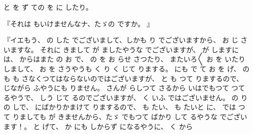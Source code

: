 と
を
ず
ての
を
に
したり。

『それは
もいけませんなナ、たゞの
ですか。
』

『イエもう、
の
した
でございまして、しかも
り
でございますから、
お
じ
さいますな。
それに
きまして
が
ましたやうな
でございますが、
が
しますには、
からはまた
の
お
で、
の
を
お
らせ
さつたり、
またいろ〳〵
お
を
いたりしまして、
お
を
さうやうも
く
り
く
じて
りまする。
にも
で
て
お
を
げ、
の
も
も
さなくつてはならないのではございますが、
と
も
つて
りまするので、
じながら
ふやうにも
りません。
さんが
らしつて
さるから
いはでもつて
つて
るやうで、
しう
じて
るのでございますが、
く
いふ
ではございません。
の
りの
しで、
にばかりかまけて
りまするので、
も
たい、
も
たいと
に、
では
つて
りましても
が
きませんから、たゞ
でもつて
ばかり
して
るやうな
でございます！。
と
げて、
か
にも
しからず
になるやうに、
く
から
